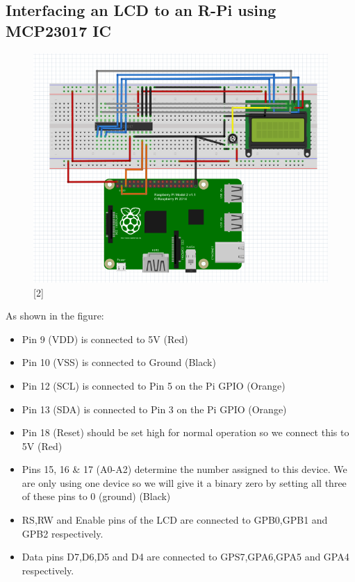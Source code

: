 \documentclass[11pt,a4paper]{article}
\begin{document}
	\subsection{Interfacing an LCD to an R-Pi using MCP23017 IC}
	\begin{figure}[h!]
		\includegraphics[scale=0.7]{i2.PNG}
		\centering
		\caption{[2]}
	\end{figure} 
	
	 As shown in the figure:
	 \begin{itemize}
	 	\item Pin 9 (VDD) is connected to 5V (Red)
	 	\item Pin 10 (VSS) is connected to Ground (Black)
	 	\item Pin 12 (SCL) is connected to Pin 5 on the Pi GPIO (Orange)
	 	\item Pin 13 (SDA) is connected to Pin 3 on the Pi GPIO (Orange)
	 	\item Pin 18 (Reset) should be set high for normal operation so we connect this to 5V (Red)
	 	\item Pins 15, 16 \& 17 (A0-A2) determine the number assigned to this device. We are only using one device so we will give it a binary zero by setting all three of these pins to 0 (ground) (Black)
	 	\item RS,RW and Enable pins of the LCD are connected to GPB0,GPB1 and GPB2 respectively.
	 	\item Data pins D7,D6,D5 and D4 are connected to GPS7,GPA6,GPA5 and GPA4 respectively.
	 \end{itemize}
	
\end{document}
